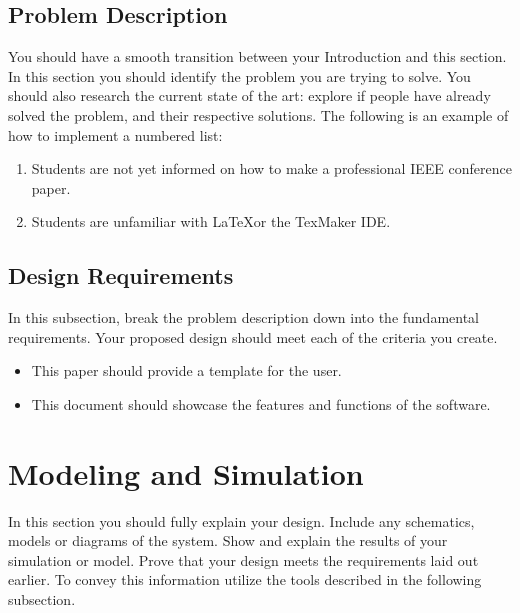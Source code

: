 \subsection{Problem Description}
You should have a smooth transition between your Introduction and this section. In this section you should identify the problem you are trying to solve. You should also research the current state of the art: explore if people have already solved the problem, and their respective solutions. The following is an example of how to implement a numbered list:

\begin{enumerate}
	\item Students are not yet informed on how to make a professional IEEE conference paper.
	\item Students are unfamiliar with \LaTeX  or the TexMaker IDE.
\end{enumerate}





\subsection{Design Requirements}
In this subsection, break the problem description down into the fundamental requirements. Your proposed design should meet each of the criteria you create.

\begin{itemize}
	\item This paper should provide a template for the user.
	\item This document should showcase the features and functions of the software.
\end{itemize}










\section{Modeling and Simulation}

In this section you should fully explain your design. Include any schematics, models or diagrams of the system. Show and explain the results of your simulation or model. Prove that your design meets the requirements laid out earlier. To convey this information utilize the tools described in the following subsection.











